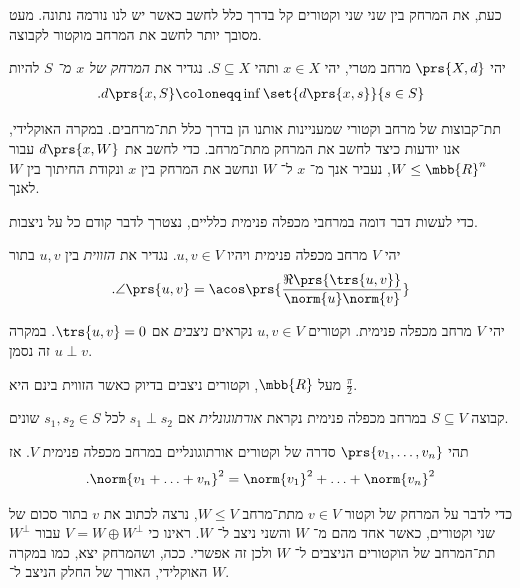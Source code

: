 \documentclass[a4paper,10pt,twoside,openany]{book}
\begin{document}
כעת, את המרחק בין שני שני וקטורים קל בדרך כלל לחשב כאשר יש לנו נורמה נתונה. מעט מסובך יותר לחשב את המרחב מוקטור לקבוצה.

\begin{definition}
יהי
$\prs{X,d}$
מרחב מטרי, יהי
$x \in X$
ותהי
$S \subseteq X$.
נגדיר את
\emph{המרחק של
$x$
מ־%
$S$}
להיות
\begin{align*}
\text{.} d\prs{x,S} \coloneqq \inf\set{d\prs{x,s}}{s \in S}
\end{align*}
\end{definition}

תת־קבוצות של מרחב וקטורי שמעניינות אותנו הן בדרך כלל תת־מרחבים. במקרה האוקלידי, אנו יודעות כיצד לחשב את המרחק מתת־מרחב. כדי לחשב את
$d\prs{x,W}$
עבור
$W \leq \mbb{R}^n$,
נעביר אנך מ־%
$x$
ל־%
$W$
ונחשב את המרחק בין
$x$
ונקודת החיתוך בין
$W$
לאנך.

כדי לעשות דבר דומה במרחבי מכפלה פנימית כלליים, נצטרך לדבר קודם כל על ניצבות.

\begin{definition}
יהי
$V$
מרחב מכפלה פנימית ויהיו
$u,v \in V$.
נגדיר את
\emph{הזווית}
בין
$u,v$
בתור
\[\text{.} \angle\prs{u,v} = \acos\prs{{\frac{\Re\prs{\trs{u,v}}}{\norm{u} \norm{v}}}}\]
\end{definition}

\begin{definition}
יהי
$V$
מרחב מכפלה פנימית.
וקטורים
$u,v \in V$
נקראים
\emph{ניצבים}
אם
$\trs{u,v} = 0$.
במקרה זה נסמן
$u \perp v$.
\end{definition}

\begin{remark}
מעל
$\mbb{R}$,
וקטורים ניצבים בדיוק כאשר הזווית בינם היא
$\frac{\pi}{2}$.
\end{remark}

\begin{definition}
קבוצה
$S \subseteq V$
במרחב מכפלה פנימית נקראת
\emph{אורתוגונלית}
אם
$s_1 \perp s_2$
לכל
$s_1, s_2 \in S$
שונים.
\end{definition}

\begin{theorem}[פיתגורס]
תהי
$\prs{v_1, \ldots, v_n}$
סדרה של וקטורים אורתוגונליים במרחב מכפלה פנימית
$V$.
אז
\begin{align*}
\text{.} \norm{v_1 + \ldots + v_n}^2 = \norm{v_1}^2 + \ldots + \norm{v_n}^2
\end{align*}
\end{theorem}

כדי לדבר על המרחק של וקטור
$v \in V$
מתת־מרחב
$W \leq V$,
נרצה לכתוב את
$v$
בתור סכום של שני וקטורים, כאשר אחד מהם מ־%
$W$
והשני ניצב ל־%
$W$.
ראינו כי
$V = W \oplus W^{\perp}$
עבור
$W^\perp$
תת־המרחב של הוקטורים הניצבים ל־%
$W$
ולכן זה אפשרי.
ככה, ושהמרחק יצא, כמו במקרה האוקלידי, האורך של החלק הניצב ל־%
$W$.
\end{document}
